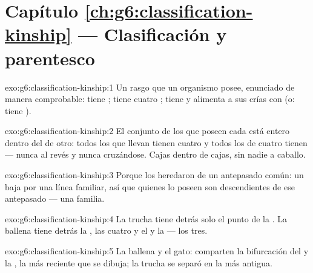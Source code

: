 \section*{Capítulo \ref{ch:g6:classification-kinship} --- Clasificación y parentesco}

\begin{solution}{exo:g6:classification-kinship:1}
Un rasgo que un organismo posee, enunciado de manera comprobable: tiene
; tiene cuatro ; tiene  y alimenta a
sus crías con  (o: tiene ).
\end{solution}

\begin{solution}{exo:g6:classification-kinship:2}
El conjunto de los que poseen cada  está entero dentro del de
otro: todos los que llevan  tienen cuatro  y todos los
 de cuatro  tienen  --- nunca al
revés y nunca cruzándose. Cajas dentro de cajas, sin nadie a caballo.
\end{solution}

\begin{solution}{exo:g6:classification-kinship:3}
Porque los heredaron de un antepasado común: un  baja por una
línea familiar, así que quienes lo poseen son descendientes de ese
antepasado --- una familia.
\end{solution}

\begin{solution}{exo:g6:classification-kinship:4}
La trucha tiene detrás solo el punto de la . La
ballena tiene detrás la , las cuatro  y el
 y la  --- los tres.
\end{solution}

\begin{solution}{exo:g6:classification-kinship:5}
La ballena y el gato: comparten la bifurcación del  y la , la
más reciente que se dibuja; la trucha se separó en la más antigua.
\end{solution}


